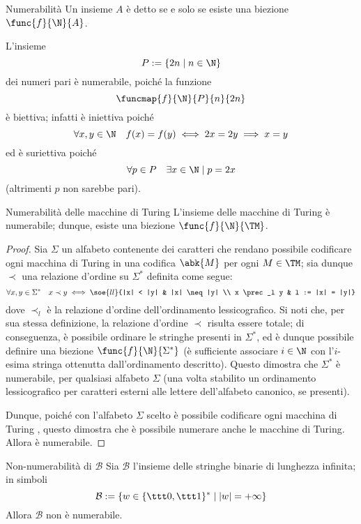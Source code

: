 \documentclass[a4paper, 12pt]{report}
\begin{document}
    \begin{frameddefn}{Numerabilità}
        Un insieme $A$ è detto  se e solo se esiste una biezione $\func{f}{\N}{A}$.
    \end{frameddefn}

    \begin{example}
        L'insieme $$P := \{2n \mid n \in \N\}$$ dei numeri pari è numerabile, poiché la funzione $$\funcmap{f}{\N}{P}{n}{2n}$$ è biettiva; infatti è iniettiva poiché $$\forall x, y \in \N \quad f(x) = f(y) \iff 2x = 2y \implies x = y$$ ed è suriettiva poiché $$\forall p \in P \quad \exists x \in \N \mid p = 2x$$ (altrimenti $p$ non sarebbe pari).
    \end{example}

    \begin{framedlem}[label={num tm}]{Numerabilità delle macchine di Turing}
        L'insieme delle macchine di Turing è numerabile; dunque, esiste una biezione $\func{f}{\N}{\TM}$.
    \end{framedlem}

    \begin{proof}
        Sia $\Sigma$ un alfabeto contenente dei caratteri che rendano possibile codificare ogni macchina di Turing in una codifica $\abk{M}$ per ogni $M \in \TM$; sia dunque $\prec$ una relazione d'ordine su $\Sigma^*$ definita come segue: $$\forall x, y \in \Sigma^* \quad x \prec y \iff \soe{ll}{|x| < |y| & |x| \neq |y| \\ x \prec_l y & l := |x| = |y|}$$ dove $\prec_l$ è la relazione d'ordine dell'ordinamento lessicografico. Si noti che, per sua stessa definizione, la relazione d'ordine $\prec$ risulta essere totale; di conseguenza, è possibile ordinare  le stringhe presenti in $\Sigma^*$, ed è dunque possibile definire una biezione $\func{f}{\N}{\Sigma^*}$ (è sufficiente associare $i \in \N$ con l'$i$-esima stringa ottenutta dall'ordinamento descritto). Questo dimostra che $\Sigma^*$ è numerabile, per qualsiasi alfabeto $\Sigma$ (una volta stabilito un ordinamento lessicografico per caratteri esterni alle lettere dell'alfabeto canonico, se presenti).

        Dunque, poiché con l'alfabeto $\Sigma$ scelto è possibile codificare ogni macchina di Turing \TM, questo dimostra che è possibile numerare anche le macchine di Turing. Allora \TM è numerabile.
    \end{proof}

    \begin{framedprop}[label={not num B}]{Non-numerabilità di $\mathcal B$}
        Sia $\mathcal B$ l'insieme delle stringhe binarie di lunghezza infinita; in simboli $$\mathcal B := \{w \in \{\ttt 0, \ttt 1\}^* \mid |w| = + \infty\}$$ Allora $\mathcal B$ non è numerabile.
    \end{framedprop}
\end{document}
